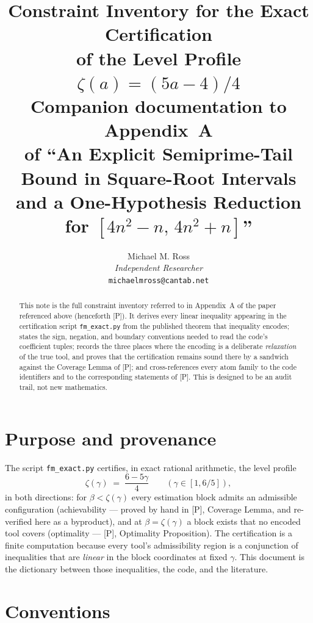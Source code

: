 \documentclass[11pt]{article}
\title{Constraint Inventory for the Exact Certification\\
of the Level Profile $\zeta(a)=(5a-4)/4$\\[2mm]
\large Companion documentation to Appendix~A\\
of ``An Explicit Semiprime-Tail Bound in Square-Root Intervals\\
and a One-Hypothesis Reduction for $[4n^2-n,\,4n^2+n]$''}
\author{Michael M. Ross\\
\textit{Independent Researcher}\\
\small \texttt{michaelmross@cantab.net}}
\theoremstyle{remark}
\newcommand{\code}[1]{\texttt{#1}}
\begin{document}
\maketitle

\begin{abstract}\noindent
This note is the full constraint inventory referred to in Appendix~A of the
paper referenced above (henceforth [P]). It derives every linear inequality appearing
in the certification script \code{fm\_exact.py} from the published theorem
that inequality encodes; states the sign, negation, and boundary conventions
needed to read the code's coefficient tuples; records the three places
where the encoding is a deliberate \emph{relaxation} of the true tool, and
proves that the certification remains sound there by a sandwich against the
Coverage Lemma of [P]; and cross-references every atom family to the code
identifiers and to the corresponding statements of [P]. This is designed to be an audit trail, not new mathematics.
\end{abstract}

\section{Purpose and provenance}\label{sec:purpose}

The script \code{fm\_exact.py} certifies, in exact rational arithmetic,
the level profile
\[
\zeta(\gamma)\;=\;\frac{6-5\gamma}{4}\qquad(\gamma\in[1,6/5]),
\]
in both directions: for $\beta<\zeta(\gamma)$ every estimation block
admits an admissible configuration (achievability --- proved by hand in
[P], Coverage Lemma, and re-verified here as a byproduct), and at
$\beta=\zeta(\gamma)$ a block exists that no encoded tool covers
(optimality --- [P], Optimality Proposition). The certification is a
finite computation because every tool's admissibility region is a
conjunction of inequalities that are \emph{linear} in the block
coordinates at fixed $\gamma$. This document is the dictionary between
those inequalities, the code, and the literature.

\section{Conventions}\label{sec:conventions}
\end{document}
